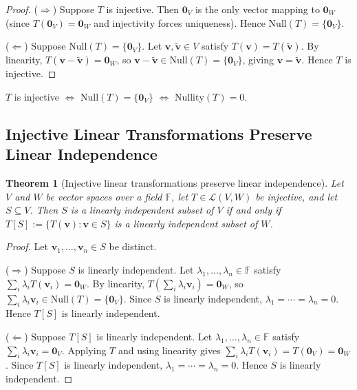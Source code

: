 \documentclass[11pt, a4paper, notitlepage]{report}
\newtheorem{theorem}{Theorem}[section]
\theoremstyle{definition}
\theoremstyle{remark}
\begin{document}
\begin{proof}
($\Rightarrow$) Suppose $T$ is injective.  Then $\mathbf{0}_V$ is the only vector mapping to
$\mathbf{0}_W$ (since $T(\mathbf{0}_V) = \mathbf{0}_W$ and injectivity forces uniqueness).
Hence $\mathrm{Null}(T) = \{\mathbf{0}_V\}$.

($\Leftarrow$) Suppose $\mathrm{Null}(T) = \{\mathbf{0}_V\}$.  Let $\mathbf{v},\tilde{\mathbf{v}}
\in V$ satisfy $T(\mathbf{v}) = T(\tilde{\mathbf{v}})$.  By linearity,
$T(\mathbf{v}-\tilde{\mathbf{v}}) = \mathbf{0}_W$, so $\mathbf{v} - \tilde{\mathbf{v}} \in
\mathrm{Null}(T) = \{\mathbf{0}_V\}$, giving $\mathbf{v} = \tilde{\mathbf{v}}$.  Hence $T$ is
injective.
\end{proof}

\begin{keyresult}[title={Key Result: Null-Space Test for Injectivity}]
$T$ is injective $\iff$ $\mathrm{Null}(T) = \{\mathbf{0}_V\}$ $\iff$ $\mathrm{Nullity}(T) = 0$.
\end{keyresult}

\subsection{Injective Linear Transformations Preserve Linear Independence}

\begin{theorem}[Injective linear transformations preserve linear independence]
\label{thm:injective-lin-indep}
Let $V$ and $W$ be vector spaces over a field $\mathbb{F}$, let $T \in \mathcal{L}(V,W)$ be
injective, and let $S \subseteq V$.  Then $S$ is a linearly independent subset of $V$ if and
only if $T[S] := \{T(\mathbf{v}) : \mathbf{v} \in S\}$ is a linearly independent subset of
$W$.
\end{theorem}

\begin{proof}
Let $\mathbf{v}_1, \ldots, \mathbf{v}_n \in S$ be distinct.

($\Rightarrow$) Suppose $S$ is linearly independent.  Let $\lambda_1,\ldots,\lambda_n\in\mathbb{F}$
satisfy $\sum_i \lambda_i T(\mathbf{v}_i) = \mathbf{0}_W$.  By linearity,
$T\!\left(\sum_i \lambda_i \mathbf{v}_i\right) = \mathbf{0}_W$, so $\sum_i \lambda_i \mathbf{v}_i
\in \mathrm{Null}(T) = \{\mathbf{0}_V\}$.  Since $S$ is linearly independent,
$\lambda_1 = \cdots = \lambda_n = 0$.  Hence $T[S]$ is linearly independent.

($\Leftarrow$) Suppose $T[S]$ is linearly independent.  Let $\lambda_1,\ldots,\lambda_n\in\mathbb{F}$
satisfy $\sum_i \lambda_i \mathbf{v}_i = \mathbf{0}_V$.  Applying $T$ and using linearity gives
$\sum_i \lambda_i T(\mathbf{v}_i) = T(\mathbf{0}_V) = \mathbf{0}_W$.  Since $T[S]$ is linearly
independent, $\lambda_1 = \cdots = \lambda_n = 0$.  Hence $S$ is linearly independent.
\end{proof}
\end{document}
